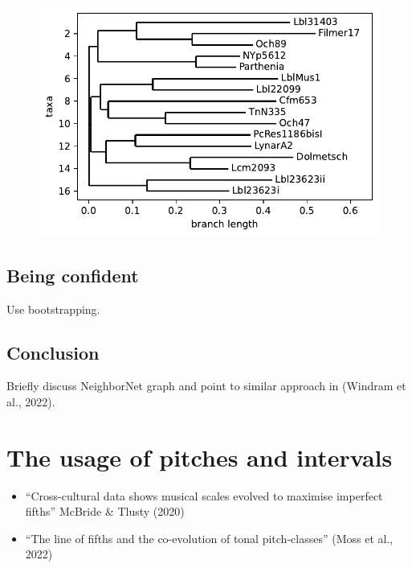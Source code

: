 \documentclass[
  a4paperpaper,
  ,captions=tableheading
]{scrbook}
\providecommand{\tightlist}{%
  \setlength{\itemsep}{0pt}\setlength{\parskip}{0pt}}
\begin{document}
\begin{figure}[H]

{\centering \includegraphics{document_traditions_files/figure-pdf/cell-8-output-1.pdf}

}

\end{figure}

\hypertarget{being-confident}{%
\section{Being confident}\label{being-confident}}

Use bootstrapping.

\hypertarget{conclusion}{%
\section{Conclusion}\label{conclusion}}

Briefly discuss NeighborNet graph and point to similar approach in
(Windram et al., 2022).

\hypertarget{the-usage-of-pitches-and-intervals}{%
\chapter{The usage of pitches and
intervals}\label{the-usage-of-pitches-and-intervals}}

\begin{itemize}
\tightlist
\item
  ``Cross-cultural data shows musical scales evolved to maximise
  imperfect fifths'' McBride \& Tlusty (2020)
\item
  ``The line of fifths and the co-evolution of tonal pitch-classes''
  (Moss et al., 2022)
\end{itemize}
\end{document}

